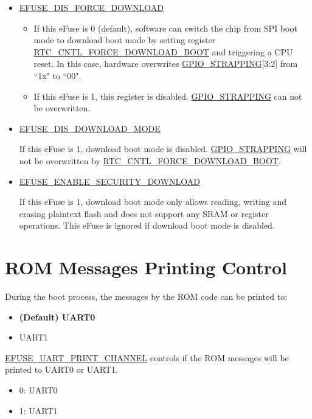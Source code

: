 \documentclass[main\_\_EN.tex]{subfiles}
\begin{document}
\begin{itemize}
    \item \hyperref[fielddesc:EFUSEDISFORCEDOWNLOAD]{EFUSE\_DIS\_FORCE\_DOWNLOAD} 
    \begin{itemize}
        \item If this eFuse is 0 (default), software can switch the chip from SPI boot mode to download boot mode by setting register \hyperref[fielddesc:RTCCNTLFORCEDOWNLOADBOOT]{RTC\_CNTL\_FORCE\_DOWNLOAD\_BOOT} and triggering a CPU reset. In this case, hardware overwrites \hyperref[fielddesc:GPIOSTRAPPING]{GPIO\_STRAPPING}[3:2] from ``1x" to ``00".
        \item If this eFuse is 1, this register is disabled. \hyperref[fielddesc:GPIOSTRAPPING]{GPIO\_STRAPPING} can not be overwritten. 
    \end{itemize}    
    \item \hyperref[fielddesc:EFUSEDISDOWNLOADMODE]{EFUSE\_DIS\_DOWNLOAD\_MODE}
 
    If this eFuse is 1, download boot mode is disabled. \hyperref[fielddesc:GPIOSTRAPPING]{GPIO\_STRAPPING} will not be overwritten by \hyperref[fielddesc:RTCCNTLFORCEDOWNLOADBOOT]{RTC\_CNTL\_FORCE\_DOWNLOAD\_BOOT}.
    \item \hyperref[fielddesc:EFUSEENABLESECURITYDOWNLOAD]{EFUSE\_ENABLE\_SECURITY\_DOWNLOAD}


If this eFuse is 1, download boot mode only allows reading, writing and erasing plaintext flash and does not support any SRAM or register operations. This eFuse is ignored if download boot mode is disabled.
\end{itemize}

\section{ROM Messages Printing Control}

During the boot process, the messages by the ROM code can be printed to:

\begin{itemize}
    \item \textbf{(Default) UART0}
    \item UART1
\end{itemize}

\hyperref[fielddesc:EFUSEUARTPRINTCHANNEL]{EFUSE\_UART\_PRINT\_CHANNEL} controls if the ROM messages will be printed to UART0 or UART1.
\begin{itemize}
    \item 0: UART0
    \item 1: UART1
\end{itemize}
\end{document}
